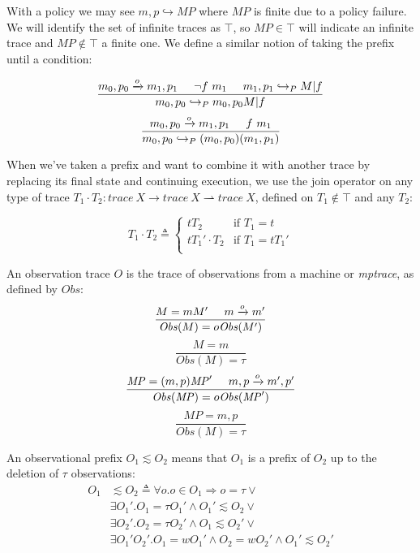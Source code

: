 \documentclass[conference]{IEEEtran}
\newcommand{\MP}{\mathit{MP}}
\begin{document}
    With a policy we may see \(m,p \hookrightarrow \MP\) where \(\MP\) is finite due to a policy
    failure. We will identify the set of infinite traces 
    as \(\top\), so \(\MP \in \top\) will
    indicate an infinite trace and \(\MP \not \in \top\) a finite one.
    We define a similar notion of taking the prefix until a condition:

    \[\frac{m_0,p_0 \xrightarrow{o} m_1,p_1 \hspace{.5cm} \neg f\ m_1 \hspace{.5cm} m_1,p_1
              \hookrightarrow_P M | f }
           {m_0,p_0 \hookrightarrow_P m_0,p_0 M | f}\]
    \[\frac{m_0,p_0 \xrightarrow{o} m_1,p_1 \hspace{.5cm} f\ m_1}
           {m_0,p_0 \hookrightarrow_P (m_0,p_0) (m_1,p_1)}\]

    When we've taken a prefix and want to combine it with another trace by replacing its final
    state and continuing execution, we use the join operator on any type of trace \(T_1 \cdot T_2 :
    \mathit{trace}\ X \rightarrow \mathit{trace}\ X \rightharpoonup \mathit{trace}\ X\), defined
    on \(T_1 \not \in \top\) and any \(T_2\):

    \[T_1 \cdot T_2 \triangleq
      \begin{cases}
        t T_2 & \text{if } T_1 = t \\
        t T_1' \cdot T_2 & \text{if } T_1 = t T_1' \\
      \end{cases}\]

    An observation trace \(O\) is the trace of observations from a machine or {\it mptrace},
    as defined by \(\mathit{Obs}\):
    \[\frac{M = mM' \hspace{.5cm} m \xrightarrow{o} m'}
           {\mathit{Obs}(M) = o\mathit{Obs}(M')}\]
    \[\frac{M = m}
           {\mathit{Obs}(M) = \tau}\]
    \[\frac{\MP = (m,p)\MP' \hspace{.5cm} m,p \xrightarrow{o} m',p'}
           {\mathit{Obs}(\MP) = o \mathit{Obs}(\MP')}\]
    \[\frac{\MP = m,p}
           {\mathit{Obs}(M) = \tau}\]

    An observational prefix \(O_1 \lesssim O_2\) means that \(O_1\) is a prefix of \(O_2\) up to the deletion
    of \(\tau\) observations:
    \[\begin{split}
      O_1 & \lesssim O_2 \triangleq \forall o . o \in O_1 \Rightarrow o = \tau \lor \\
      & \exists O_1' . O_1 = \tau O_1' \land O_1' \lesssim O_2 \lor \\
      & \exists O_2' .  O_2 = \tau O_2' \land O_1 \lesssim O_2' \lor \\
      & \exists O_1' O_2' . O_1 = w O_1' \land O_2 = w O_2' \land O_1' \lesssim O_2' \\
    \end{split}\]
    
\end{document}
